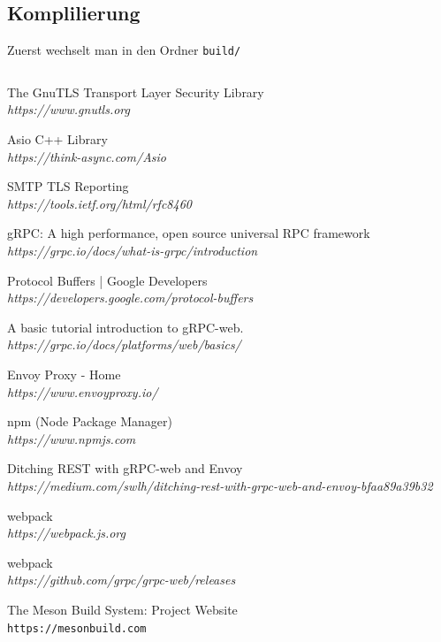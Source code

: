 \documentclass[12pt]{article}
\def\code#1{\texttt{#1}}
\begin{document}
\subsection{Komplilierung}
Zuerst wechselt man in den Ordner \code{build/}
\begin{verbatim}
\end{verbatim}



\begin{thebibliography}{25}
The GnuTLS Transport Layer Security Library
\\\textit{https://www.gnutls.org}

Asio C++ Library
\\\textit{https://think-async.com/Asio}

SMTP TLS Reporting
\\\textit{https://tools.ietf.org/html/rfc8460}

gRPC: A high performance, open source universal RPC framework
\\\textit{https://grpc.io/docs/what-is-grpc/introduction}

Protocol Buffers | Google Developers
\\\textit{https://developers.google.com/protocol-buffers}

A basic tutorial introduction to gRPC-web.
\\\textit{https://grpc.io/docs/platforms/web/basics/}

Envoy Proxy - Home
\\\textit{https://www.envoyproxy.io/}

npm (Node Package Manager)
\\\textit{https://www.npmjs.com}

Ditching REST with gRPC-web and Envoy
\\\textit{https://medium.com/swlh/ditching-rest-with-grpc-web-and-envoy-bfaa89a39b32}

webpack
\\\textit{https://webpack.js.org}

webpack
\\\textit{https://github.com/grpc/grpc-web/releases}

The Meson Build System: Project Website
\\\texttt{https://mesonbuild.com}


\end{thebibliography}
\end{document}
